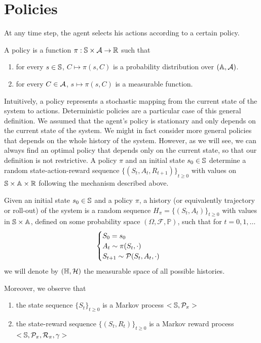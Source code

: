 \section{Policies}
At any time step, the agent selects his actions according to a certain policy. 
\begin{definition}[Policy]
	A policy is a function $\pi: \S \times \calA \to \R$ such that
	\begin{enumerate}[label={\roman*)}]
		\item for every $s \in \S$, $C \mapsto \pi(s,C)$ is a probability
			  distribution over $(\A, \calA)$. 
		\item for every $C \in \calA$, $s \mapsto \pi(s, C)$ is a measurable
			  function. 
	\end{enumerate}
\end{definition}
Intuitively, a policy represents a stochastic mapping from the current state of
the system to actions. Deterministic policies are a particular case of this 
general definition. We assumed that the agent's policy is stationary and only
depends on the current state of the system. We might in fact  consider more 
general policies that depends on the whole history of the system. However, as
we will see, we can always find an optimal policy that depends only on the
current state, so that our definition is not restrictive. A policy $\pi$ and an
initial state $s_0 \in \S$ determine a random state-action-reward sequence
${\{(S_t, A_t, R_{t+1})\}}_{t\geq 0}$ with values on $\S \times \A \times \R$
following the mechanism described above. 
\begin{definition}[History]
	Given an initial state $s_0 \in \S$ and a policy $\pi$, a history (or
	equivalently trajectory or roll-out) of the system is a random sequence
	$H_\pi = {\{(S_t, A_t)\}}_{t\geq 0}$ with values in $\S \times \A$, defined
	on some probability space $(\Omega, \mathcal{F}, \mathbb{P})$, such that for 
	$t = 0, 1, \ldots$
	\begin{equation*}
		\begin{cases}
			S_0 = s_0\\
			A_t \sim \pi(S_t, \cdot)\\
			S_{t+1} \sim \calP(S_t, A_t, \cdot)\\
		\end{cases}
	\end{equation*}
	we will denote by $(\H, \calH)$ the measurable space of all possible
	histories. 
\end{definition}
Moreover, we observe that
\begin{enumerate}[label={\roman*)}]
	\item the state sequence ${\{S_t\}}_{t\geq 0}$ is a Markov process $<\S,
		  \calP_\pi>$
	  \item the state-reward sequence ${\{(S_t, R_t)\}}_{t\geq 0}$ is a Markov 
		  reward process $<\S, \calP_\pi, \calR_\pi, \gamma>$
\end{enumerate}
